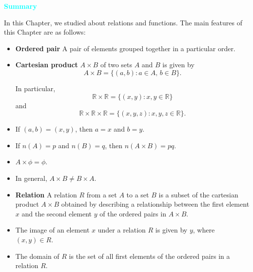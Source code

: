 \documentclass[11pt]{article}
\begin{document}
\begin{mdframed}[
  backgroundcolor=cyan!15,
  linecolor=cyan!40,
  linewidth=0pt,
  leftmargin=0pt,
  rightmargin=0pt,
  innerleftmargin=12pt,
  innerrightmargin=12pt,
  innertopmargin=10pt,
  innerbottommargin=10pt,
  skipabove=10pt,
  skipbelow=10pt,
  split=true
]

\begin{center}
\textcolor{cyan}{\textbf{Summary}}
\end{center}

In this Chapter, we studied about relations and functions.
The main features of this Chapter are as follows:

\vspace{6pt}

\begin{itemize}[leftmargin=1.8em]

\item[$\diamond$] \textbf{Ordered pair}  
A pair of elements grouped together in a particular order.

\item[$\diamond$] \textbf{Cartesian product}  
$A \times B$ of two sets $A$ and $B$ is given by
\[
A \times B = \{(a,b): a\in A,\, b\in B\}.
\]

In particular,
\[
\mathbb{R}\times\mathbb{R} = \{(x,y): x,y\in\mathbb{R}\}
\]
and
\[
\mathbb{R}\times\mathbb{R}\times\mathbb{R} = \{(x,y,z): x,y,z\in\mathbb{R}\}.
\]

\item[$\diamond$] If $(a,b)=(x,y)$, then $a=x$ and $b=y$.

\item[$\diamond$] If $n(A)=p$ and $n(B)=q$, then $n(A\times B)=pq$.

\item[$\diamond$] $A\times\phi=\phi$.

\item[$\diamond$] In general, $A\times B\neq B\times A$.

\item[$\diamond$] \textbf{Relation}  
A relation $R$ from a set $A$ to a set $B$ is a subset of the cartesian product
$A\times B$ obtained by describing a relationship between the first element $x$
and the second element $y$ of the ordered pairs in $A\times B$.

\item[$\diamond$] The image of an element $x$ under a relation $R$ is given by $y$,
where $(x,y)\in R$.

\item[$\diamond$] The domain of $R$ is the set of all first elements of the ordered
pairs in a relation $R$.


\end{itemize}
\end{mdframed}
\end{document}
